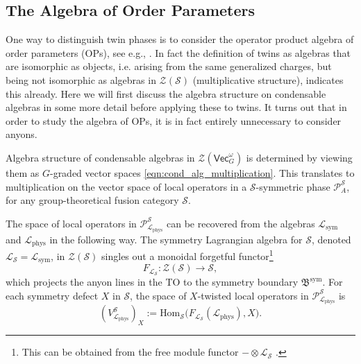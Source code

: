 \documentclass[aps,twocolumn,prx,floatfix,preprintnumbers, nofootinbib,10pt]{revtex4-2}
\numberwithin{equation}{section}
\theoremstyle{definition}
\newcommand{\be}{\begin{equation}}
\newcommand{\ee}{\end{equation}}
\newcommand{\Bsym}{\mathfrak{B}^{\text{sym}}}
\newcommand{\cL}{\mathcal{L}}
\newcommand{\cP}{\mathcal{P}}
\newcommand{\cS}{\mathcal{S}}
\newcommand{\cZ}{\mathcal{Z}}
\newcommand{\Hom}{\text{Hom}}
\renewcommand{\Vec}{\mathsf{Vec}}
\newcommand{\sym}{\text{sym}}
\newcommand{\phys}{\text{phys}}
\begin{document}
\subsection{The Algebra of Order Parameters}

One way to distinguish twin phases is to consider the operator product algebra of order parameters (OPs), see e.g., \cite{Chavda:2026mpz}. In fact the definition of twins as algebras that are isomorphic as objects, i.e. arising from the same generalized charges, but being not isomorphic as algebras in $\cZ(\cS)$ (multiplicative structure), indicates this already. 
Here we will first discuss the algebra structure on condensable algebras in some more detail before applying these to twins. It turns out that in order to study the algebra of OPs, it is in fact entirely unnecessary to consider anyons. 




Algebra structure of condensable algebras in $\cZ(\Vec_G^\omega)$ is determined by viewing them as $G$-graded vector spaces \eqref{eqn:cond_alg_multiplication}. This translates to multiplication on the vector space of local operators in a $\cS$-symmetric phase $\cP^{\cS}_{A}$, for any group-theoretical fusion category $\cS$.

The space of local operators in $\cP^{\cS}_{\cL_\phys}$ can be recovered from the algebras $\cL_\sym$ and $\cL_\phys$ in the following way. The symmetry Lagrangian algebra for $\cS$, denoted $\cL_\cS=\cL_\sym$, in $\cZ(\cS)$ singles out a monoidal forgetful functor\footnote{This can be obtained from the free module functor $-\otimes \cL_{\cS}$ \cite{davydov2013witt}.} 
\begin{equation}
    F_{\cL_\cS}: \cZ(\cS) \rightarrow \cS,
\end{equation}
which projects the anyon lines in the TO to the symmetry boundary $\Bsym$. For each symmetry defect $X$ in $\cS$, the space of $X$-twisted local operators in $\cP_{\cL_\phys}^{\cS}$ is
\be
    (V^{\cS}_{\cL_\phys})_{X}:=\Hom_{\cS}\bigl(F_{\cL_\cS}(\cL_\phys), X\bigr).
\ee
\end{document}
